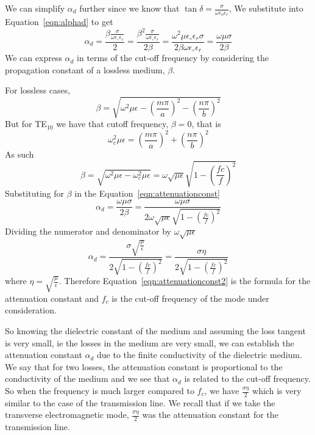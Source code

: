 We can simplify $\alpha_d$ further since we know that $\tan\delta = \frac{\sigma}{\omega\epsilon_{o}\epsilon_{r}}$, We substitute into Equation~\eqref{eqn:alphad} to get
\begin{dmath}
\alpha_{d} = \frac{\beta \frac{\sigma}{\omega\epsilon_\circ\epsilon_r}}{2}
= \frac{\beta^2 \frac{\sigma}{\omega\epsilon_\circ\epsilon_r}}{2\beta}
= \frac{\omega^2\mu\epsilon_\circ\epsilon_r\sigma}{2\beta\omega\epsilon_\circ\epsilon_r}
= \frac{\omega\mu\sigma}{2\beta}
\label{eqn:attenuationconst}
\end{dmath}
We can express $\alpha_d$ in terms of the cut-off frequency by considering the propagation constant of a lossless medium, $\beta$.

For lossless cases, 
\begin{equation*}
\beta = \sqrt{\omega^{2}\mu\epsilon-\left(\frac{m\pi}{a}\right)^{2}-\left(\frac{n\pi}{b}\right)^{2}}
\end{equation*}
But for TE$_{10}$ we have that cutoff frequency, $\beta = 0$, that is
\begin{equation*}
\omega^{2}_{c}\mu\epsilon = \left(\frac{m\pi}{a}\right)^{2}+\left(\frac{n\pi}{b}\right)^{2}
\end{equation*}
As such
\begin{dmath*}
\beta = \sqrt{\omega^{2}\mu\epsilon-\omega^{2}_{c}\mu\epsilon} = \omega\sqrt{\mu\epsilon}\sqrt{1-\left(\frac{fc}{f}\right)^{2}}
\end{dmath*}
Substituting for $\beta$ in the Equation~\ref{eqn:attenuationconst}
\begin{dmath*}	
\alpha_{d}=\frac{\omega\mu\sigma}{2\beta}= \frac{\omega\mu\sigma}{2\omega\sqrt{\mu\epsilon}\sqrt{1-\left(\frac{fc}{f}\right)^{2}}}
\end{dmath*}
Dividing the numerator and denominator by $\omega\sqrt{\mu\epsilon}$
\begin{dmath}
\alpha_{d} = \frac{\sigma\sqrt{\frac{\mu}{\epsilon}}}{2\sqrt{1-\left(\frac{fc}{f}\right)^{2}}}=\frac{\sigma\eta}{2\sqrt{1 - \left(\frac{fc}{f}\right)^{2}}}
\label{eqn:attenuationconst2}
\end{dmath}
where $\eta= \sqrt{\frac{\mu}{\epsilon}}$. Therefore Equation~\ref{eqn:attenuationconst2} is the formula for the attenuation constant and $f_c$ is the cut-off frequency of the mode under consideration.

So knowing the dielectric constant of the medium and assuming the loss tangent is very small, ie the losses in the medium are very small, we can establish the attenuation constant $\alpha_{d}$ due to the finite conductivity of the dielectric medium. We say that for two losses, the attenuation constant is proportional to the conductivity of the medium and we see that $\alpha_{d}$ is related to the cut-off frequency. So when the frequency is much larger compared to $f_{c}$, we have $\frac{\sigma\eta}{2}$ which is very similar to the case of the transmission line. We recall that if we take the transverse electromagnetic mode, $\frac{\sigma\eta}{2}$ was the attenuation constant for the transmission line.

